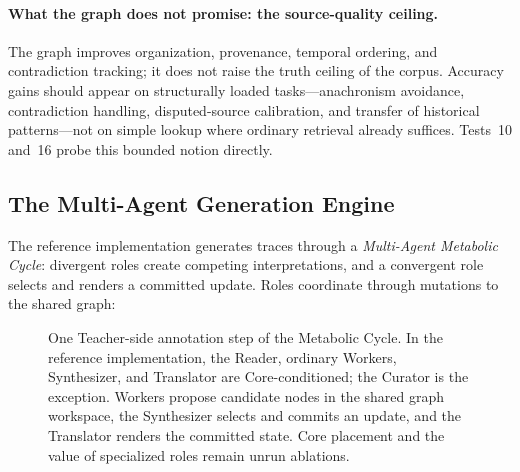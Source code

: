 \paragraph{What the graph does not promise: the source-quality ceiling.} The
graph improves organization, provenance, temporal ordering, and contradiction
tracking; it does not raise the truth ceiling of the corpus. Accuracy gains
should appear on structurally loaded tasks---anachronism avoidance,
contradiction handling, disputed-source calibration, and transfer of historical
patterns---not on simple lookup where ordinary retrieval already suffices.
Tests~10 and~16 probe this bounded notion directly.


\subsection{The Multi-Agent Generation Engine}
\label{sec:multi-agent}

The reference implementation generates traces through a \emph{Multi-Agent
Metabolic Cycle}: divergent roles create competing interpretations, and a
convergent role selects and renders a committed update. Roles coordinate through
mutations to the shared graph:

\begin{figure}[h]
    \centering
    \resizebox{\textwidth}{!}{}
    \caption{One Teacher-side annotation step of the Metabolic Cycle. In the reference implementation, the Reader, ordinary Workers, Synthesizer, and Translator are Core-conditioned; the Curator is the exception. Workers propose candidate nodes in the shared graph workspace, the Synthesizer selects and commits an update, and the Translator renders the committed state. Core placement and the value of specialized roles remain unrun ablations.}
    \label{fig:metabolic-cycle}
\end{figure}
\FloatBarrier

